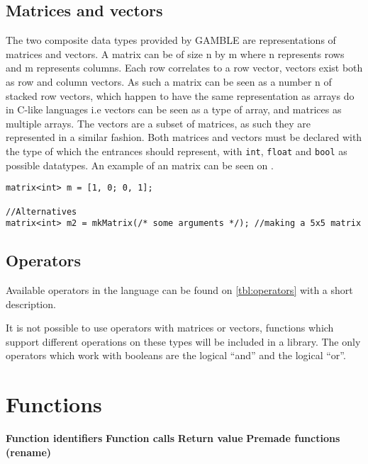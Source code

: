 \subsection{Matrices and vectors}
The two composite data types provided by GAMBLE are representations of matrices and vectors.
A matrix can be of size n by m where n represents rows and m represents columns.
Each row correlates to a row vector, vectors exist both as row and column vectors.
As such a matrix can be seen as a number n of stacked row vectors, which happen to have the same representation as arrays do in C-like languages i.e vectors can be seen as a type of array, and matrices as multiple arrays.
The vectors are a subset of matrices, as such they are represented in a similar fashion.
Both matrices and vectors must be declared with the type of which the entrances should represent, with \texttt{int}, \texttt{float} and \texttt{bool} as possible datatypes.
An example of an matrix can be seen on .

\begin{lstlisting}[caption={Creating a matrix},label={lst:matrix}]
matrix<int> m = [1, 0; 0, 1];

//Alternatives
matrix<int> m2 = mkMatrix(/* some arguments */); //making a 5x5 matrix
\end{lstlisting}

\subsection*{Operators}
Available operators in the language can be found on \ref{tbl:operators} with a short description.
  
It is not possible to use operators with matrices or vectors, functions which support different operations on these types will be included in a library.
The only operators which work with booleans are the logical ``and'' and the logical ``or''. 

\section{Functions}
\textbf{Function identifiers}
\textbf{Function calls}
\textbf{Return value}
\textbf{Premade functions (rename)}


%


